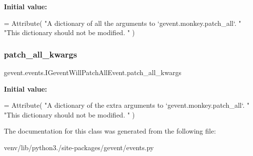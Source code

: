 {\bfseries Initial value\+:}
\begin{DoxyCode}
=  Attribute(
        \textcolor{stringliteral}{"A dictionary of all the arguments to `gevent.monkey.patch\_all`. "}
        \textcolor{stringliteral}{"This dictionary should not be modified. "}
    )
\end{DoxyCode}
\mbox{\label{classgevent_1_1events_1_1_i_gevent_will_patch_all_event_a0e24c8030539830d72b804923886b757}} 
\subsubsection{\texorpdfstring{patch\+\_\+all\+\_\+kwargs}{patch\_all\_kwargs}}
{\footnotesize\ttfamily gevent.\+events.\+I\+Gevent\+Will\+Patch\+All\+Event.\+patch\+\_\+all\+\_\+kwargs\hspace{0.3cm}{\ttfamily [static]}}

{\bfseries Initial value\+:}
\begin{DoxyCode}
=  Attribute(
        \textcolor{stringliteral}{"A dictionary of the extra arguments to `gevent.monkey.patch\_all`. "}
        \textcolor{stringliteral}{"This dictionary should not be modified. "}
    )
\end{DoxyCode}


The documentation for this class was generated from the following file\+:\begin{DoxyCompactItemize}
\item 
venv/lib/python3./site-\/packages/gevent/events.\+py\end{DoxyCompactItemize}
